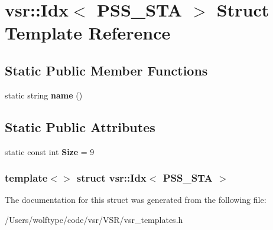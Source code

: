 \hypertarget{structvsr_1_1_idx_3_01_p_s_s___s_t_a_01_4}{\section{vsr\-:\-:Idx$<$ P\-S\-S\-\_\-\-S\-T\-A $>$ Struct Template Reference}
\label{structvsr_1_1_idx_3_01_p_s_s___s_t_a_01_4}
}
\subsection*{Static Public Member Functions}
\begin{DoxyCompactItemize}
\item 
\hypertarget{structvsr_1_1_idx_3_01_p_s_s___s_t_a_01_4_a26c65b6c42dace8ce052a51e2da930c0}{static string {\bfseries name} ()}\label{structvsr_1_1_idx_3_01_p_s_s___s_t_a_01_4_a26c65b6c42dace8ce052a51e2da930c0}

\end{DoxyCompactItemize}
\subsection*{Static Public Attributes}
\begin{DoxyCompactItemize}
\item 
\hypertarget{structvsr_1_1_idx_3_01_p_s_s___s_t_a_01_4_acd0913f5f3493a9796a697fd461ad054}{static const int {\bfseries Size} = 9}\label{structvsr_1_1_idx_3_01_p_s_s___s_t_a_01_4_acd0913f5f3493a9796a697fd461ad054}

\end{DoxyCompactItemize}
\subsubsection*{template$<$$>$ struct vsr\-::\-Idx$<$ P\-S\-S\-\_\-\-S\-T\-A $>$}



The documentation for this struct was generated from the following file\-:\begin{DoxyCompactItemize}
\item 
/\-Users/wolftype/code/vsr/\-V\-S\-R/vsr\-\_\-templates.\-h\end{DoxyCompactItemize}
